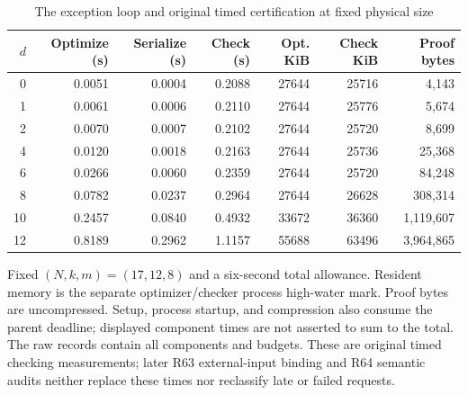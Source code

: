 \documentclass[11pt,letterpaper]{article}
\theoremstyle{definition}\newtheorem{remark}[theorem]{Remark}
\begin{document}
\begin{table}[p]\centering\caption{The exception loop and original timed certification at fixed physical size}\label{tab:d63}
\begin{singlespace}\small\begin{tabular}{rrrrrrr}\toprule
$d$ & Optimize (s) & Serialize (s) & Check (s) & Opt. KiB & Check KiB & Proof bytes\\\midrule
0 & 0.0051 & 0.0004 & 0.2088 & 27644 & 25716 & 4,143 \\
1 & 0.0061 & 0.0006 & 0.2110 & 27644 & 25776 & 5,674 \\
2 & 0.0070 & 0.0007 & 0.2102 & 27644 & 25720 & 8,699 \\
4 & 0.0120 & 0.0018 & 0.2163 & 27644 & 25736 & 25,368 \\
6 & 0.0266 & 0.0060 & 0.2359 & 27644 & 25720 & 84,248 \\
8 & 0.0782 & 0.0237 & 0.2964 & 27644 & 26628 & 308,314 \\
10 & 0.2457 & 0.0840 & 0.4932 & 33672 & 36360 & 1,119,607 \\
12 & 0.8189 & 0.2962 & 1.1157 & 55688 & 63496 & 3,964,865 \\
\bottomrule\end{tabular}\par\smallskip\begin{minipage}{\textwidth}\footnotesize Fixed $(N,k,m)=(17,12,8)$ and a six-second total allowance. Resident memory is the separate optimizer/checker process high-water mark. Proof bytes are uncompressed. Setup, process startup, and compression also consume the parent deadline; displayed component times are not asserted to sum to the total. The raw records contain all components and budgets. These are original timed checking measurements; later R63 external-input binding and R64 semantic audits neither replace these times nor reclassify late or failed requests.\end{minipage}\end{singlespace}\end{table}
\end{document}
